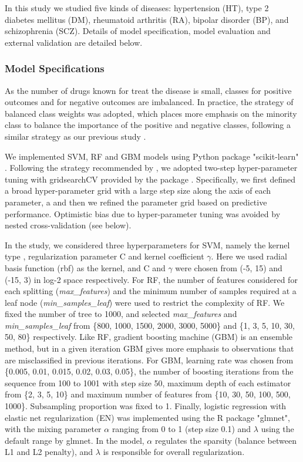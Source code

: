     In this study we studied five kinds of diseases: hypertension (HT), type 2 diabetes mellitus (DM), rheumatoid arthritis (RA), bipolar disorder (BP), and schizophrenia (SCZ). Details of model specification, model evaluation and external validation are detailed below.  

    \subsubsection{Model Specifications}
      As the number of drugs known for treat the disease is small, classes for positive outcomes and for negative outcomes are imbalanced. In practice, the strategy of balanced class weights was adopted, which places more emphasis on the minority class to balance the importance of the positive and negative classes, following a similar strategy as our previous study \cite{zhao2018drug}. 
      
      We implemented SVM, RF and GBM models using Python package "scikit-learn" \cite{pedregosa2011scikit}. Following the strategy recommended by \cite{hsu2003practical}, we adopted two-step hyper-parameter tuning with gridsearchCV provided by the package \cite{pedregosa2011scikit}.  Specifically, we first defined a broad hyper-parameter grid with a large step size along the axis of each parameter, a and then we refined the parameter grid based on predictive performance. Optimistic bias due to hyper-parameter tuning was avoided by nested cross-validation (see below).
 
      In the study, we considered three hyperparameters for SVM, namely the kernel type , regularization parameter C and kernel coefficient $\gamma$. Here we used radial basis function (rbf) as the kernel, and C and $\gamma$ were chosen from (-5, 15) and (-15, 3) in log-2 space respectively. For RF, the number of features considered for each splitting (\textit{max\_features}) and the minimum number of samples required at a leaf node (\textit{min\_samples\_leaf}) were used to restrict the complexity of RF. We fixed the number of tree to 1000, and selected \textit{max\_features} and \textit{min\_samples\_leaf} from \{800, 1000, 1500, 2000, 3000, 5000\} and \{1, 3, 5, 10, 30, 50, 80\} respectively. Like RF, gradient boosting machine (GBM) is an ensemble method, but in a given iteration GBM gives more emphasis to observations that are misclassified in previous iterations.  For GBM, learning rate was chosen from \{0.005, 0.01, 0.015, 0.02, 0.03, 0.05\}, the number of boosting iterations from the sequence from 100 to 1001 with step size 50, maximum depth of each estimator from \{2, 3, 5, 10\} and maximum number of features from \{10, 30, 50, 100, 500, 1000\}. Subsampling proportion was fixed to 1. Finally, logistic regression with elastic net regularization (EN) was implemented using the R package "glmnet", with the mixing parameter $\alpha$ ranging from 0 to 1 (step size 0.1) and $\lambda$ using the default range by glmnet. In the model, $\alpha$ regulates the sparsity (balance between L1 and L2 penalty), and $\lambda$ is responsible for overall regularization. 

